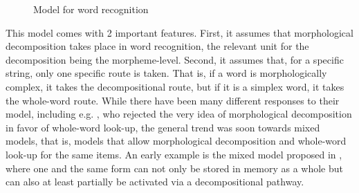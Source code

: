 \begin{figure}[h]
\begin{center}
{\begin{tikzpicture}



\end{tikzpicture}  
}

  \caption{Model for word recognition \citep{TaftandForster:1975}}
  \label{fig:taft_forster_word-recognition-model}
\end{center}
\end{figure}
\noindent
This model comes with 2 important features. First, it assumes that
morphological decomposition takes place in word recognition, the
relevant unit for the decomposition being the morpheme-level. Second,
it assumes that, for a specific string, only one specific
route is taken. That is, if a word is morphologically complex, it takes
the decompositional route, but if it is a simplex word, it takes the
whole-word route. 
While there have been many different responses to
their model, including e.g. \citet{ManelisandTharp:1977}, who rejected the very idea of
morphological decomposition in favor of whole-word look-up, the general
trend was soon towards mixed
models, that is, models that allow morphological decomposition and
whole-word look-up for the same items. An early example is the mixed model proposed in
\citet{Stannersetal:1979}, where one and the
same form can not only be stored in memory as a whole but can also at
least partially be
activated via a decompositional pathway.


